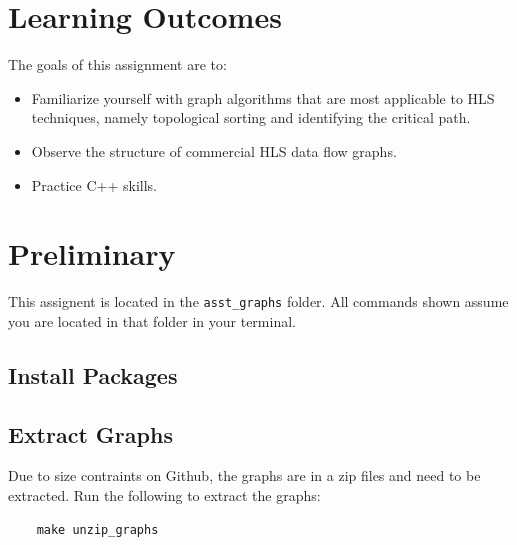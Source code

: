 



\setuppage



\maketitle
\thispagestyle{fancy}

\section{Learning Outcomes}
The goals of this assignment are to:
\begin{itemize}
	\item Familiarize yourself with graph algorithms that are most applicable to HLS techniques, namely topological sorting and identifying the critical path.
	\item Observe the structure of commercial HLS data flow graphs.
	\item Practice C++ skills.
\end{itemize}

\section{Preliminary}
This assignent is located in the \texttt{asst\_graphs} folder.  All commands shown assume you are located in that folder in your terminal.

\subsection{Install Packages}

\subsection{Extract Graphs}
Due to size contraints on Github, the graphs are in a zip files and need to be extracted.  Run the following to extract the graphs:
\begin{lstlisting}
	make unzip_graphs
\end{lstlisting}

